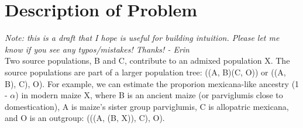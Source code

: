 \documentclass[12pt]{report}
\begin{document}
\section{Description of Problem}
\textit{Note: this is a draft that I hope is useful for building intuition. Please let me know if you see any typos/mistakes! Thanks! - Erin}\\
Two source populations, B and C, contribute to an admixed population X. The source populations are part of a larger population tree: ((A, B)(C, O)) or ((A, B), C), O). %
For example, we can estimate the proporion mexicana-like ancestry (1 - $\alpha$) in modern maize X, where B is an ancient maize (or parviglumis close to domestication), A is maize's sister group parviglumis, C is allopatric mexicana, and O is an outgroup: (((A, (B, X)), C), O). \par

\end{document}
